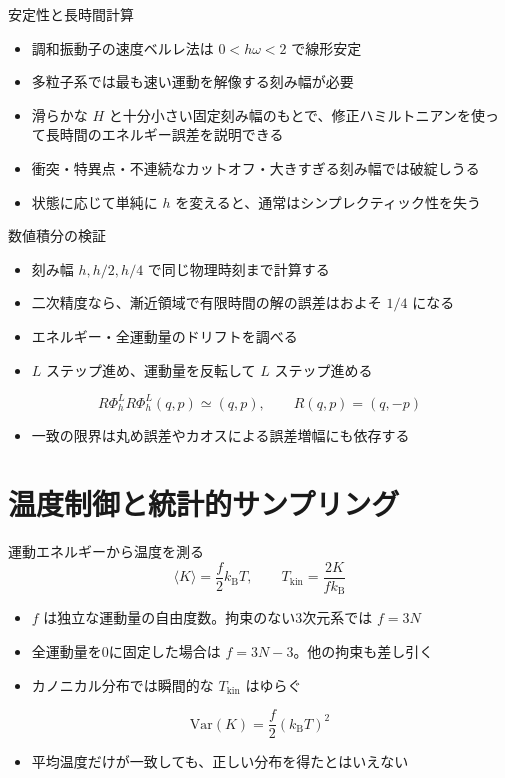 \documentclass[10pt,aspectratio=169]{beamer}
\begin{document}
\begin{frame}{安定性と長時間計算}
\begin{itemize}
\item 調和振動子の速度ベルレ法は $0<h\omega<2$ で線形安定
\item 多粒子系では最も速い運動を解像する刻み幅が必要
\item 滑らかな $H$ と十分小さい固定刻み幅のもとで、修正ハミルトニアンを使って長時間のエネルギー誤差を説明できる
\item 衝突・特異点・不連続なカットオフ・大きすぎる刻み幅では破綻しうる
\item 状態に応じて単純に $h$ を変えると、通常はシンプレクティック性を失う
\end{itemize}
\end{frame}

\begin{frame}{数値積分の検証}
\begin{itemize}
\item 刻み幅 $h,h/2,h/4$ で同じ物理時刻まで計算する
\item 二次精度なら、漸近領域で有限時間の解の誤差はおよそ $1/4$ になる
\item エネルギー・全運動量のドリフトを調べる
\item $L$ ステップ進め、運動量を反転して $L$ ステップ進める
\end{itemize}
\[
R\Phi_h^L R\Phi_h^L(q,p)\simeq(q,p),\qquad R(q,p)=(q,-p)
\]
\begin{itemize}
\item 一致の限界は丸め誤差やカオスによる誤差増幅にも依存する
\end{itemize}
\end{frame}

\section{温度制御と統計的サンプリング}

\begin{frame}{運動エネルギーから温度を測る}
\[
\langle K\rangle=\frac{f}{2}k_{\mathrm B}T,\qquad
T_{\mathrm{kin}}=\frac{2K}{f k_{\mathrm B}}
\]
\begin{itemize}
\item $f$ は独立な運動量の自由度数。拘束のない3次元系では $f=3N$
\item 全運動量を0に固定した場合は $f=3N-3$。他の拘束も差し引く
\item カノニカル分布では瞬間的な $T_{\mathrm{kin}}$ はゆらぐ
\end{itemize}
\[
\mathrm{Var}(K)=\frac{f}{2}(k_{\mathrm B}T)^2
\]
\begin{itemize}
\item 平均温度だけが一致しても、正しい分布を得たとはいえない
\end{itemize}
\end{frame}
\end{document}
